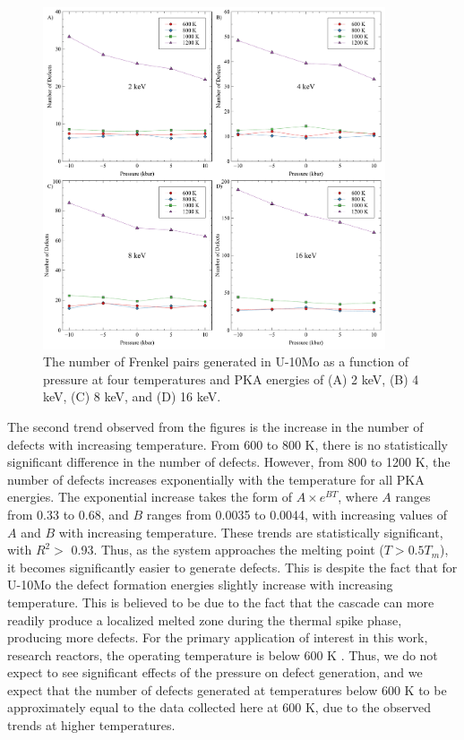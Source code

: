 \documentclass[review]{elsarticle}
\begin{document}
\begin{figure}[h!]
    \centering
    \includegraphics[width=0.9\textwidth]{rad_dam_P.pdf}
    \caption{The number of Frenkel pairs generated in U-10Mo as a function of pressure at four temperatures and PKA energies of (A) 2 keV, (B) 4 keV, (C) 8 keV, and (D) 16 keV.}
    \label{fig:rad_dam}
\end{figure}

The second trend observed from the figures is the increase in the number of defects with increasing temperature. From 600 to 800 K, there is no statistically significant difference in the number of defects. However, from 800 to 1200 K, the number of defects increases exponentially with the temperature for all PKA energies. The exponential increase takes the form of $ A \times e^{BT}$, where $A$ ranges from 0.33 to 0.68, and $B$ ranges from 0.0035 to 0.0044, with increasing values of $A$ and $B$ with increasing temperature. These trends are statistically significant, with $R^2 >$ 0.93. Thus, as the system approaches the melting point ($T>0.5T_m$), it becomes significantly easier to generate defects. This is despite the fact that for U-10Mo the defect formation energies slightly increase with increasing temperature. This is believed to be due to the fact that the cascade can more readily produce a localized melted zone during the thermal spike phase, producing more defects. For the primary application of interest in this work, research reactors, the operating temperature is below 600 K \cite{umo_prelim_report2017}. Thus, we do not expect to see significant effects of the pressure on defect generation, and we expect that the number of defects generated at temperatures below 600 K to be approximately equal to the data collected here at 600 K, due to the observed trends at higher temperatures. 
\end{document}

